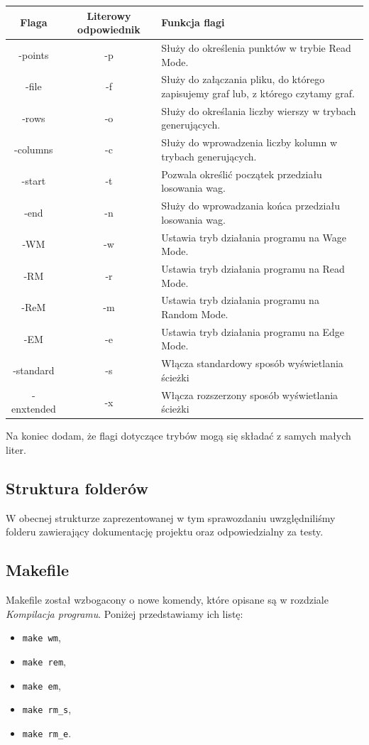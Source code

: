 \documentclass[10pt, a4paper]{report}
\begin{document}
    \begin{tabularx}{\textwidth}{ c|c|X }
        \hline Flaga & Literowy odpowiednik & Funkcja flagi \\
        \hline -points & -p & Służy do określenia punktów w trybie Read Mode.\\
        \hline -file & -f & Służy do załączania pliku, do którego zapisujemy graf lub, z którego czytamy graf.\\
        \hline -rows & -o & Służy do określania liczby wierszy w trybach generujących.\\
        \hline -columns & -c & Służy do wprowadzenia liczby kolumn w trybach generujących.\\
        \hline -start & -t & Pozwala określić początek przedziału losowania wag.\\
        \hline -end & -n & Służy do wprowadzania końca przedziału losowania wag.\\
        \hline -WM & -w & Ustawia tryb działania programu na Wage Mode.\\
        \hline -RM & -r & Ustawia tryb działania programu na Read Mode.\\
        \hline -ReM & -m & Ustawia tryb działania programu na Random Mode.\\
        \hline -EM & -e & Ustawia tryb działania programu na Edge Mode.\\
        \hline -standard & -s & Włącza standardowy sposób wyświetlania ścieżki\\
        \hline -enxtended & -x & Włącza rozszerzony sposób wyświetlania ścieżki\\
        \hline
    \end{tabularx}
    \newline\newline Na koniec dodam, że flagi dotyczące trybów mogą się składać z samych małych liter.

    \subsection{Struktura folderów}
    W obecnej strukturze zaprezentowanej w tym sprawozdaniu uwzględniliśmy folderu zawierający dokumentację projektu oraz odpowiedzialny za testy.

    \subsection{Makefile}
    Makefile został wzbogacony o nowe komendy, które opisane są w rozdziale \textit{Kompilacja programu}. Poniżej przedstawiamy ich listę:
    \begin{itemize}
        \item \texttt{make wm},
        \item \texttt{make rem},
        \item \texttt{make em},
        \item \texttt{make rm\_s},
        \item \texttt{make rm\_e}.
    \end{itemize}   
    
\end{document}
